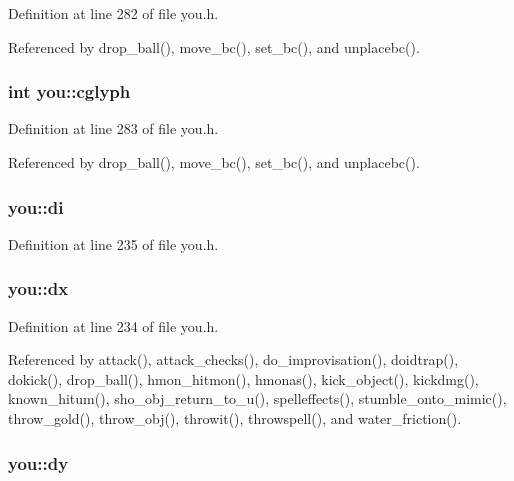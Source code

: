 Definition at line 282 of file you.\+h.



Referenced by drop\+\_\+ball(), move\+\_\+bc(), set\+\_\+bc(), and unplacebc().

\hypertarget{structyou_aa08408f1685acac28ede4200fae7e866}{
\subsubsection[{cglyph}]{\setlength{\rightskip}{0pt plus 5cm}int you\+::cglyph}}\label{structyou_aa08408f1685acac28ede4200fae7e866}


Definition at line 283 of file you.\+h.



Referenced by drop\+\_\+ball(), move\+\_\+bc(), set\+\_\+bc(), and unplacebc().

\hypertarget{structyou_a55ff3cdd92bd76de5e01547a6d1db540}{
\subsubsection[{di}]{ you\+::di}}\label{structyou_a55ff3cdd92bd76de5e01547a6d1db540}


Definition at line 235 of file you.\+h.

\hypertarget{structyou_a0b53da9e296cbebbc3dc2fc6ade21aeb}{
\subsubsection[{dx}]{ you\+::dx}}\label{structyou_a0b53da9e296cbebbc3dc2fc6ade21aeb}


Definition at line 234 of file you.\+h.



Referenced by attack(), attack\+\_\+checks(), do\+\_\+improvisation(), doidtrap(), dokick(), drop\+\_\+ball(), hmon\+\_\+hitmon(), hmonas(), kick\+\_\+object(), kickdmg(), known\+\_\+hitum(), sho\+\_\+obj\+\_\+return\+\_\+to\+\_\+u(), spelleffects(), stumble\+\_\+onto\+\_\+mimic(), throw\+\_\+gold(), throw\+\_\+obj(), throwit(), throwspell(), and water\+\_\+friction().

\hypertarget{structyou_a80d068cfe5c15ae06e6f152be40a716f}{
\subsubsection[{dy}]{ you\+::dy}}\label{structyou_a80d068cfe5c15ae06e6f152be40a716f}


